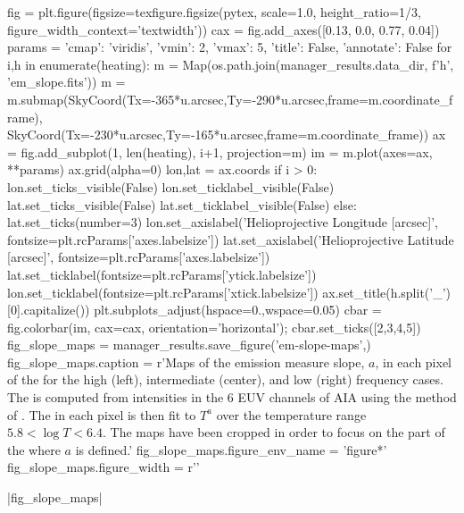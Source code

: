\begin{pycode}
fig = plt.figure(figsize=texfigure.figsize(pytex, scale=1.0, height_ratio=1/3,
                                           figure_width_context='textwidth'))
cax = fig.add_axes([0.13, 0.0, 0.77, 0.04])
params = {'cmap': 'viridis', 'vmin': 2, 'vmax': 5, 'title': False, 'annotate': False}
for i,h in enumerate(heating):
    m = Map(os.path.join(manager_results.data_dir, f'{h}', 'em_slope.fits'))
    m = m.submap(SkyCoord(Tx=-365*u.arcsec,Ty=-290*u.arcsec,frame=m.coordinate_frame),
                 SkyCoord(Tx=-230*u.arcsec,Ty=-165*u.arcsec,frame=m.coordinate_frame))
    ax = fig.add_subplot(1, len(heating), i+1, projection=m)
    im = m.plot(axes=ax, **params)
    ax.grid(alpha=0)
    lon,lat = ax.coords
    if i > 0:
        lon.set_ticks_visible(False)
        lon.set_ticklabel_visible(False)
        lat.set_ticks_visible(False)
        lat.set_ticklabel_visible(False)
    else:
        lat.set_ticks(number=3)
        lon.set_axislabel('Helioprojective Longitude [arcsec]',
                          fontsize=plt.rcParams['axes.labelsize'])
        lat.set_axislabel('Helioprojective Latitude [arcsec]',
                          fontsize=plt.rcParams['axes.labelsize'])
        lat.set_ticklabel(fontsize=plt.rcParams['ytick.labelsize'])
        lon.set_ticklabel(fontsize=plt.rcParams['xtick.labelsize'])
    ax.set_title(h.split('_')[0].capitalize())
plt.subplots_adjust(hspace=0.,wspace=0.05)
cbar = fig.colorbar(im, cax=cax, orientation='horizontal');
cbar.set_ticks([2,3,4,5])
fig_slope_maps = manager_results.save_figure('em-slope-maps',)
fig_slope_maps.caption = r'Maps of the emission measure slope, $a$, in each pixel of the \AR{} for the high (left), intermediate (center), and low (right) frequency cases. The \dem{} is computed from intensities in the 6 EUV channels of AIA using the method of \citet{hannah_differential_2012}. The \dem{} in each pixel is then fit to $T^a$ over the temperature range $5.8<\log{T}<6.4$. The maps have been cropped in order to focus on the part of the \AR{} where $a$ is defined.'
fig_slope_maps.figure_env_name = 'figure*'
fig_slope_maps.figure_width = r'\textwidth' 
\end{pycode}
|fig_slope_maps|


